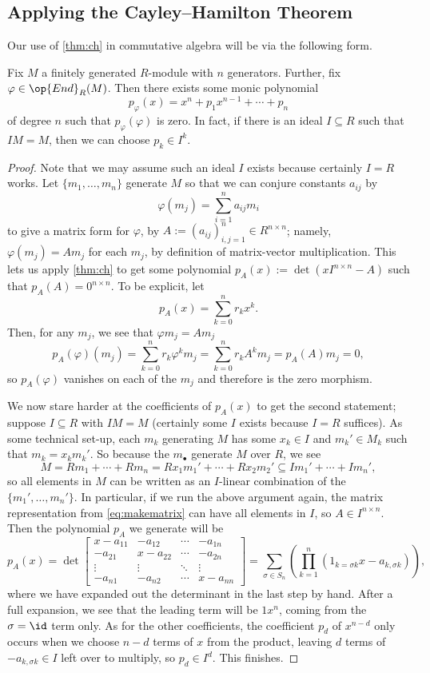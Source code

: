 \subsection{Applying the Cayley--Hamilton Theorem}
Our use of \autoref{thm:ch} in commutative algebra will be via the following form.
\begin{theorem} \label{thm:betterch}
	Fix $M$ a finitely generated $R$-module with $n$ generators. Further, fix $\varphi\in\op{End}_R(M)$. Then there exists some monic polynomial
	\[p_\varphi(x)=x^n+p_1x^{n-1}+\cdots+p_n\]
	of degree $n$ such that $p_\varphi(\varphi)$ is zero. In fact, if there is an ideal $I\subseteq R$ such that $IM=M$, then we can choose $p_k\in I^k$.
\end{theorem}
\begin{proof}
	Note that we may assume such an ideal $I$ exists because certainly $I=R$ works. Let $\{m_1,\ldots,m_n\}$ generate $M$ so that we can conjure constants $a_{ij}$ by
	\[\varphi(m_j)=\sum_{i=1}^na_{ij}m_i\tag{$*$}\label{eq:makematrix}\]
	to give a matrix form for $\varphi$, by $A:=(a_{ij})_{i,j=1}^n\in R^{n\times n}$; namely, $\varphi(m_j)=Am_j$ for each $m_j$, by definition of matrix-vector multiplication. This lets us apply \autoref{thm:ch} to get some polynomial $p_A(x):=\det(xI^{n\times n}-A)$ such that $p_A(A)=0^{n\times n}$. To be explicit, let
	\[p_A(x)=\sum_{k=0}^nr_kx^k.\]
	Then, for any $m_j$, we see that $\varphi m_j=Am_j$
	\[p_A(\varphi)(m_j)=\sum_{k=0}^nr_k\varphi^km_j=\sum_{k=0}^nr_kA^km_j=p_A(A)m_j=0,\]
	so $p_A(\varphi)$ vanishes on each of the $m_j$ and therefore is the zero morphism.

	We now stare harder at the coefficients of $p_A(x)$ to get the second statement; suppose $I\subseteq R$ with $IM=M$ (certainly some $I$ exists because $I=R$ suffices). As some technical set-up, each $m_k$ generating $M$ has some $x_k\in I$ and $m_k'\in M_k$ such that $m_k=x_km_k'$. So because the $m_\bullet$ generate $M$ over $R$, we see
	\[M=Rm_1+\cdots+Rm_n=Rx_1m_1'+\cdots+Rx_2m_2'\subseteq Im_1'+\cdots+Im_n',\]
	so all elements in $M$ can be written as an $I$-linear combination of the $\{m_1',\ldots,m_n'\}$. In particular, if we run the above argument again, the matrix representation from \eqref{eq:makematrix} can have all elements in $I$, so $A\in I^{n\times n}$. Then the polynomial $p_A$ we generate will be
	\[p_A(x)=\det\begin{bmatrix}
		x-a_{11} & -a_{12} & \cdots & -a_{1n} \\
		-a_{21} & x-a_{22} & \cdots & -a_{2n} \\
		\vdots & \vdots & \ddots & \vdots \\
		-a_{n1} & -a_{n2} & \cdots & x-a_{nn}
	\end{bmatrix}=\sum_{\sigma\in S_n}\left(\prod_{k=1}^n(1_{k=\sigma k}x-a_{k,\sigma k})\right),\]
	where we have expanded out the determinant in the last step by hand. After a full expansion, we see that the leading term will be $1x^n$, coming from the $\sigma=\id$ term only. As for the other coefficients, the coefficient $p_d$ of $x^{n-d}$ only occurs when we choose $n-d$ terms of $x$ from the product, leaving $d$ terms of $-a_{k,\sigma k}\in I$ left over to multiply, so $p_d\in I^d$. This finishes.
\end{proof}
